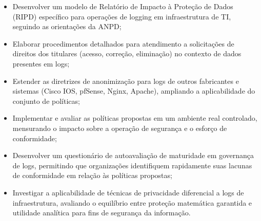 \begin{itemize}
    \item Desenvolver um modelo de Relatório de Impacto à Proteção de Dados (RIPD) específico para operações de logging em infraestrutura de TI, seguindo as orientações da ANPD;
    \item Elaborar procedimentos detalhados para atendimento a solicitações de direitos dos titulares (acesso, correção, eliminação) no contexto de dados presentes em logs;
    \item Estender as diretrizes de anonimização para logs de outros fabricantes e sistemas (Cisco IOS, pfSense, Nginx, Apache), ampliando a aplicabilidade do conjunto de políticas;
    \item Implementar e avaliar as políticas propostas em um ambiente real controlado, mensurando o impacto sobre a operação de segurança e o esforço de conformidade;
    \item Desenvolver um questionário de autoavaliação de maturidade em governança de logs, permitindo que organizações identifiquem rapidamente suas lacunas de conformidade em relação às políticas propostas;
    \item Investigar a aplicabilidade de técnicas de privacidade diferencial a logs de infraestrutura, avaliando o equilíbrio entre proteção matemática garantida e utilidade analítica para fins de segurança da informação.
\end{itemize}